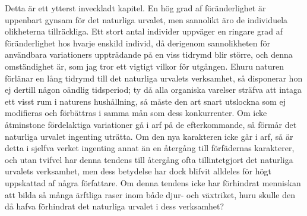 Detta är ett ytterst inveckladt kapitel. En hög grad af föränderlighet är uppenbart gynsam för det naturliga urvalet, men sannolikt äro de individuela olikheterna tillräckliga. Ett stort antal individer uppväger en ringare grad af föränderlighet hos hvarje enskild individ, då derigenom sannolikheten för användbara variationers uppträdande på en viss tidrymd blir större, och denna omständighet är, som jag tror ett vigtigt vilkor för utgången. Ehuru naturen förlänar en lång tidrymd till det naturliga urvalets verksamhet, så disponerar hon ej dertill någon oändlig tidsperiod; ty då alla organiska varelser sträfva att intaga ett visst rum i naturens hushållning, så måste den art snart utslockna som ej modifieras och förbättras i samma mån som dess konkurrenter. Om icke åtminstone fördelaktiga variationer gå i arf på de efterkommande, så förmår det naturliga urvalet ingenting uträtta. Om den nya karakteren icke går i arf, så är detta i sjelfva verket ingenting annat än en återgång till förfädernas karakterer, och utan tvifvel har denna tendens till återgång ofta tillintetgjort det naturliga urvalets verksamhet, men dess betydelse har dock blifvit alldeles för högt uppskattad af några författare. Om denna tendens icke har förhindrat menniskan att bilda så många ärftliga raser inom både djur- och växtriket, huru skulle den då hafva förhindrat det naturliga urvalet i dess verksamhet?

